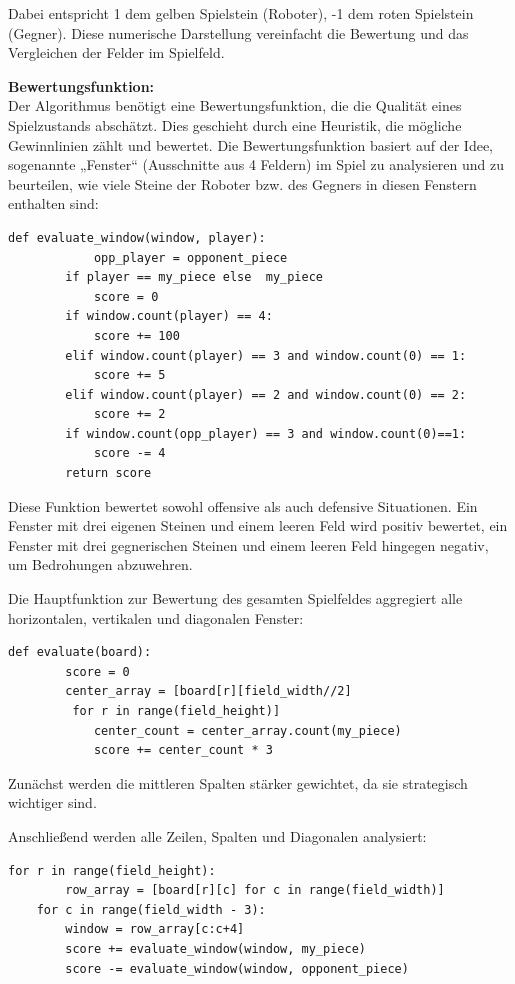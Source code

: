 Dabei entspricht 1 dem gelben Spielstein (Roboter), -1 dem roten Spielstein (Gegner). Diese numerische Darstellung vereinfacht die Bewertung und das Vergleichen der Felder im Spielfeld.

\textbf{Bewertungsfunktion:}\\
Der Algorithmus benötigt eine Bewertungsfunktion, die die Qualität eines Spielzustands abschätzt. Dies geschieht durch eine Heuristik, die mögliche Gewinnlinien zählt und bewertet.
Die Bewertungsfunktion basiert auf der Idee, sogenannte „Fenster“ (Ausschnitte aus 4 Feldern) im Spiel zu analysieren und zu beurteilen, wie viele Steine der Roboter bzw. des Gegners in diesen Fenstern enthalten sind: \newpage

\begin{lstlisting}[style=pythonstyle]
	def evaluate_window(window, player):
			opp_player = opponent_piece 
		if player == my_piece else 	my_piece
			score = 0
		if window.count(player) == 4:
			score += 100
		elif window.count(player) == 3 and window.count(0) == 1:
			score += 5
		elif window.count(player) == 2 and window.count(0) == 2:
			score += 2
		if window.count(opp_player) == 3 and window.count(0)==1:
			score -= 4
		return score
\end{lstlisting}

Diese Funktion bewertet sowohl offensive als auch defensive Situationen. Ein Fenster mit drei eigenen Steinen und einem leeren Feld wird positiv bewertet, ein Fenster mit drei gegnerischen Steinen und einem leeren Feld hingegen negativ, um Bedrohungen abzuwehren.

Die Hauptfunktion zur Bewertung des gesamten Spielfeldes aggregiert alle horizontalen, vertikalen und diagonalen Fenster:

\begin{lstlisting}[style=pythonstyle]
	def evaluate(board):
		score = 0
		center_array = [board[r][field_width//2]
		 for r in range(field_height)]
			center_count = center_array.count(my_piece)
			score += center_count * 3
\end{lstlisting}

Zunächst werden die mittleren Spalten stärker gewichtet, da sie strategisch wichtiger sind.

Anschließend werden alle Zeilen, Spalten und Diagonalen analysiert:

\begin{lstlisting}[style=pythonstyle]
	for r in range(field_height):
		row_array = [board[r][c] for c in range(field_width)]
	for c in range(field_width - 3):
		window = row_array[c:c+4]
		score += evaluate_window(window, my_piece)
		score -= evaluate_window(window, opponent_piece)
\end{lstlisting}

